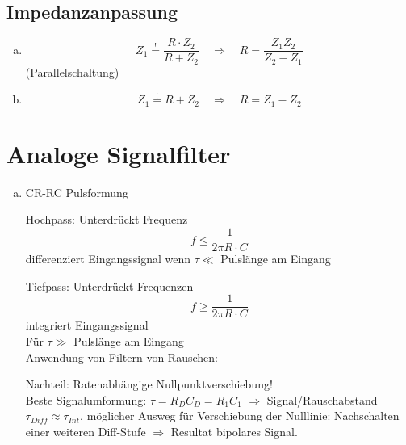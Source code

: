 \subsection{Impedanzanpassung}

\begin{enumerate}[a)]
	\item %
	\hft
	
	\noindent
	\begin{equation*}
	Z_1 \overset{!}{=} \frac{R \cdot Z_2}{R + Z_2} \quad \Rightarrow \quad R = \frac{Z_1 Z_2}{Z_2 - Z_1}
	\end{equation*}
	(Parallelschaltung)
	\item %
	\hft
	
	\noindent
	\begin{equation*}
	Z_1 \overset{!}{=} R + Z_2 \quad \Rightarrow \quad R = Z_1 - Z_2
	\end{equation*}
\end{enumerate}

\section{Analoge Signalfilter}

\begin{enumerate}[a)]
	\item CR-RC Pulsformung
	
	\hft
	
	\noindent
	Hochpass: Unterdrückt Frequenz
	\begin{equation*}
	f \le \frac{1}{2 \pi R \cdot C}
	\end{equation*}
	differenziert Eingangssignal wenn $ \tau \ll $ Pulslänge am Eingang
	
	\hft
	
	\noindent
	Tiefpass: Unterdrückt Frequenzen
	\begin{equation*}
	f \ge \frac{1}{2 \pi R \cdot C}
	\end{equation*}
	integriert Eingangssignal\\[5pt]
	Für $ \tau \gg $ Pulslänge am Eingang\\[10pt]
	Anwendung von Filtern von Rauschen:
	
	\hft
	
	\noindent
	\color{red} Nachteil: Ratenabhängige Nullpunktverschiebung! \color{black}\\[10pt]
	Beste Signalumformung: $ \tau = R_D C_D = R_1 C_1 $ $ \Rightarrow $ Signal/Rauschabstand $ \tau_{Diff} \approx \tau_{Int} $. möglicher Ausweg für Verschiebung der Nulllinie: Nachschalten einer weiteren Diff-Stufe $ \Rightarrow $ Resultat bipolares Signal.
\end{enumerate}